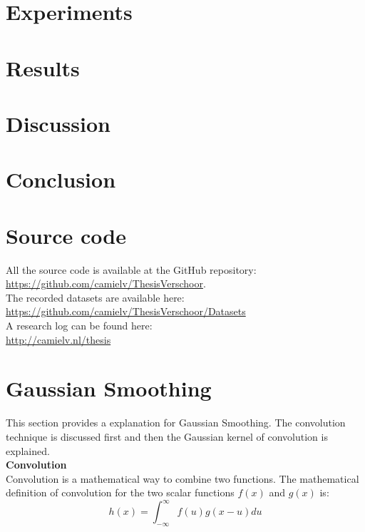 \documentclass[a4paper]{article}
\begin{document}
\section{Experiments}

\section{Results}

\section{Discussion}

\section{Conclusion}
\newpage
\begin{appendices}
\section{Source code}
All the source code is available at the GitHub repository:\\ \url{https://github.com/camielv/ThesisVerschoor}.\\
The recorded datasets are available here:\\
\url{https://github.com/camielv/ThesisVerschoor/Datasets}\\
A research log can be found here:\\
\url{http://camielv.nl/thesis}

\newpage
\section{Gaussian Smoothing}
This section provides a explanation for Gaussian Smoothing. The convolution technique is discussed first and then the Gaussian kernel of convolution is explained.\\

\noindent\textbf{Convolution}\\
Convolution is a mathematical way to combine two functions. The mathematical definition of convolution for the two scalar functions $f(x)$ and $g(x)$ is:
\begin{equation*}
h(x) = \int_{-\infty}^\infty f(u)g(x - u)du
\end{equation*}


\end{appendices}
\end{document}
